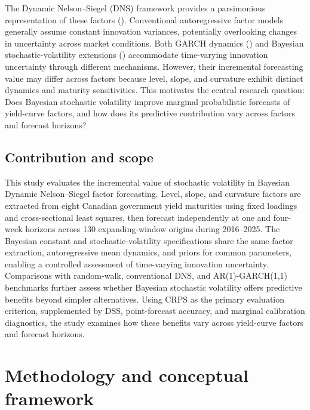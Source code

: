 \documentclass[
  12pt,
  letterpaper,
  DIV=11,
  numbers=noendperiod]{scrreprt}
\begin{document}
The Dynamic Nelson--Siegel (DNS) framework provides a parsimonious
representation of these factors
().
Conventional autoregressive factor models generally assume constant
innovation variances, potentially overlooking changes in uncertainty
across market conditions. Both GARCH dynamics
() and
Bayesian stochastic-volatility extensions
() accommodate
time-varying innovation uncertainty through different mechanisms.
However, their incremental forecasting value may differ across factors
because level, slope, and curvature exhibit distinct dynamics and
maturity sensitivities. This motivates the central research question:
Does Bayesian stochastic volatility improve marginal probabilistic
forecasts of yield-curve factors, and how does its predictive
contribution vary across factors and forecast horizons?

\section{Contribution and scope}\label{contribution-and-scope}

This study evaluates the incremental value of stochastic volatility in
Bayesian Dynamic Nelson--Siegel factor forecasting. Level, slope, and
curvature factors are extracted from eight Canadian government yield
maturities using fixed loadings and cross-sectional least squares, then
forecast independently at one and four-week horizons across 130
expanding-window origins during 2016--2025. The Bayesian constant and
stochastic-volatility specifications share the same factor extraction,
autoregressive mean dynamics, and priors for common parameters, enabling
a controlled assessment of time-varying innovation uncertainty.
Comparisons with random-walk, conventional DNS, and AR(1)-GARCH(1,1)
benchmarks further assess whether Bayesian stochastic volatility offers
predictive benefits beyond simpler alternatives. Using CRPS as the
primary evaluation criterion, supplemented by DSS, point-forecast
accuracy, and marginal calibration diagnostics, the study examines how
these benefits vary across yield-curve factors and forecast horizons.

\chapter{Methodology and conceptual framework}\label{sec-literature}
\end{document}
